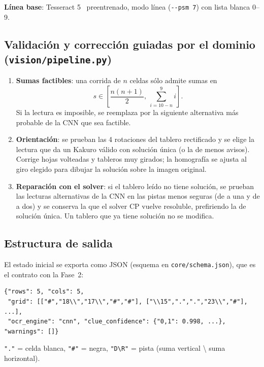\documentclass[conference,a4paper]{IEEEtran}
\begin{document}
\textbf{Línea base}: Tesseract 5~\cite{tesseract} preentrenado, modo línea (\texttt{-{}-psm 7}) con lista blanca 0--9.

\subsection{Validación y corrección guiadas por el dominio (\texttt{vision/pipeline.py})}\label{sec:valid}
\begin{enumerate}
  \item \textbf{Sumas factibles}: una corrida de $n$ celdas sólo admite sumas en
  \begin{equation}
  s \in \left[\frac{n(n+1)}{2},\ \sum_{i=10-n}^{9} i\right].
  \end{equation}
  Si la lectura es imposible, se reemplaza por la siguiente alternativa más probable de la CNN que sea factible.
  \item \textbf{Orientación}: se prueban las 4 rotaciones del tablero rectificado y se elige la lectura que da un Kakuro válido con solución
        única (o la de menos avisos). Corrige hojas volteadas y tableros muy girados; la homografía se ajusta al giro elegido para dibujar
        la solución sobre la imagen original.
  \item \textbf{Reparación con el solver}: si el tablero leído no tiene solución, se prueban las lecturas alternativas de la CNN en las pistas
        menos seguras (de a una y de a dos) y se conserva la que el solver CP vuelve resoluble, prefiriendo la de solución única.
        Un tablero que ya tiene solución no se modifica.
\end{enumerate}

\subsection{Estructura de salida}
El estado inicial se exporta como JSON (esquema en \texttt{core/schema.json}), que es el contrato con la Fase~2:
\begin{lstlisting}
{"rows": 5, "cols": 5,
 "grid": [["#","18\\","17\\","#","#"], ["\\15",".",".","23\\","#"], ...],
 "ocr_engine": "cnn", "clue_confidence": {"0,1": 0.998, ...}, "warnings": []}
\end{lstlisting}
\texttt{"."} = celda blanca, \texttt{"\#"} = negra, \texttt{"D\textbackslash R"} = pista (suma vertical \textbackslash{} suma horizontal).
\end{document}
